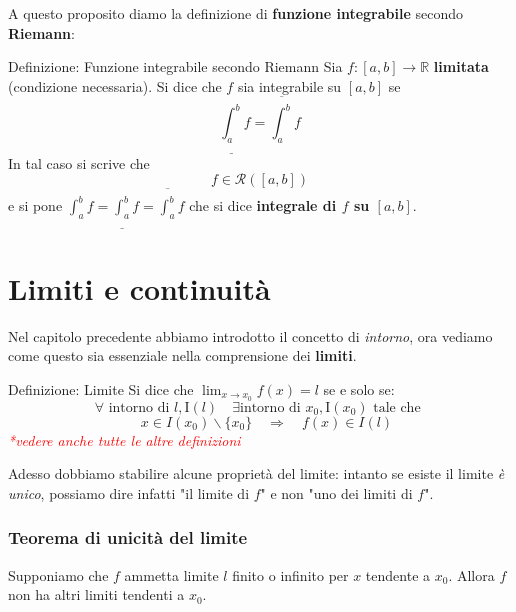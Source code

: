 \documentclass[x11names]{article}
\begin{document}
	A questo proposito diamo la definizione di \textbf{funzione integrabile} secondo \textbf{Riemann}:
		\begin{center}
		\colorbox{myblue}{\begin{minipage}{5.75in}
				\begin{blues}{Definizione: Funzione integrabile secondo Riemann}
					Sia $f:[a,b] \to \mathbb{R}$ \textbf{limitata} (condizione necessaria). Si dice che $f$ sia integrabile su $[a,b]$ se
					\[
					\underline{\int_{a}^{b}}f = \overline{\int_{a}^{b}}f 
					\]
					In tal caso si scrive che
					\[
					f \in \mathcal{R}\left(\left[a,b\right]\right)
					\]
					e si pone $\int_{a}^{b}f = \underline{\int_{a}^{b}}f = \overline{\int_{a}^{b}}f$ che si dice \textbf{integrale di $f$ su $[a,b]$}.
				\end{blues}
		\end{minipage}}       
	\end{center}
	
	\newpage
	\section{Limiti e continuità}
	Nel capitolo precedente abbiamo introdotto il concetto di \textit{intorno}, ora vediamo come questo sia essenziale nella comprensione dei \textbf{limiti}.
	
	
	\begin{center}
		\colorbox{myblue}{\begin{minipage}{5.75in}
				\begin{blues}{Definizione: Limite}
					Si dice che $\lim_{x\to x_0}f\left(x\right) = l$ se e solo se: 
					\[\forall \text{ intorno di } l, \text{I}\left(l\right) \quad \exists \text{intorno di } x_0, \text{I}\left(x_0\right) \text{ tale che }
					\]
					\[
					\quad x \in I\left(x_0\right) \backslash\{x_0\} \quad \Rightarrow \quad f\left(x\right) \in I\left(l\right)
					\]
					\textcolor{red}{\textit{*vedere anche tutte le altre definizioni}}
				\end{blues}
		\end{minipage}}       
	\end{center}
	
	
	
	
	Adesso dobbiamo stabilire alcune proprietà del limite: intanto se esiste il limite \textit{è unico}, possiamo dire infatti "il limite di $f$" e non "uno dei limiti di $f$".
	
	\begin{center}
		\colorbox{myred}{\begin{minipage}{5.75in}
				\begin{redes}{}
					\subsubsection{Teorema di unicità del limite} Supponiamo che $f$ ammetta limite $l$ finito o infinito per $x$ tendente a $x_0$. Allora $f$ non ha altri limiti tendenti a $x_0$.
				\end{redes}
		\end{minipage}}        
	\end{center}
	
\end{document}
